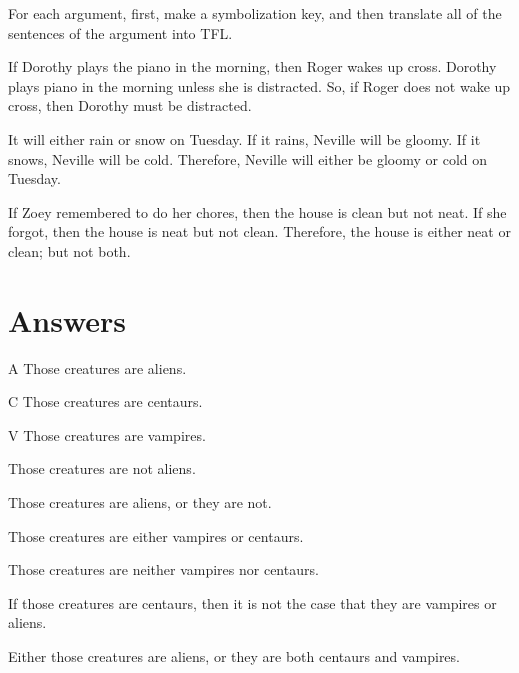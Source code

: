 \problempart
For each argument, first, make a symbolization key, and then translate all of the sentences of the argument into TFL.
\begin{earg}
\item If Dorothy plays the piano in the morning, then Roger wakes up cross. Dorothy plays piano in the morning unless she is distracted. So, if Roger does not wake up cross, then Dorothy must be distracted.

\item It will either rain or snow on Tuesday. If it rains, Neville will be gloomy. If it snows, Neville will be cold. Therefore, Neville will either be gloomy or cold on Tuesday.

\item If Zoey remembered to do her chores, then the house is clean but not neat. If she forgot, then the house is neat but not clean. Therefore, the house is either neat or clean; but not both.
\end{earg}







\section{Answers}
\setcounter{ProbPart}{0}

\problempart 
	\begin{ekey}
		\item[A] Those creatures are aliens. 
		\item[C] Those creatures are centaurs. 
		\item[V] Those creatures are vampires.
	\end{ekey}
\begin{earg}
\item Those creatures are not aliens.
\item[] 
\item Those creatures are aliens, or they are not.
\item[]  
\item Those creatures are either vampires or centaurs.
\item[] 
\item Those creatures are neither vampires nor centaurs.
\item[] 
\item If those creatures are centaurs, then it is not the case that they are vampires or aliens.
\item[] 
\item Either those creatures are aliens, or they are both centaurs and vampires.
\item[] 
\end{earg}

